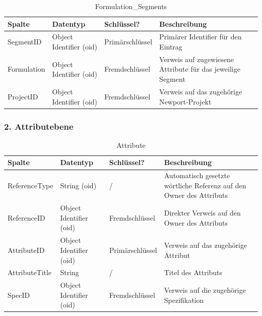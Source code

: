 \begin{table}[H]
    \centering
    \caption{Formulation\_Segments}
    \begin{tabularx}{\textwidth}{l l l X}
        \toprule
        \textbf{Spalte} & \textbf{Datentyp} & \textbf{Schlüssel?} & \textbf{Beschreibung} \\
        \midrule
        SegmentID & Object Identifier (oid) & Primärschlüssel & Primärer Identifier für den Eintrag\\
        Formulation & Object Identifier (oid) & Fremdschlüssel & Verweis auf zugewiesene Attribute für das jeweilige Segment\\
        ProjectID & Object Identifier (oid) & Fremdschlüssel & Verweis auf das zugehörige Newport-Projekt\\
        \bottomrule
    \end{tabularx}
    \label{tab:formulation_segments}
\end{table}
\subsubsection{2. Attributebene}
\begin{table}[H]
    \centering
    \caption{Attribute}
    \begin{tabularx}{\textwidth}{l l l X}
        \toprule
        \textbf{Spalte} & \textbf{Datentyp} & \textbf{Schlüssel?} & \textbf{Beschreibung} \\
        \midrule
        ReferenceType & String (oid) & / & Automatisch gesetzte wörtliche Referenz auf den Owner des Attributs\\
        ReferenceID & Object Identifier (oid) & Fremdschlüssel & Direkter Verweis auf den Owner des Attributs\\
        AttributeID & Object Identifier (oid) & Primärschlüssel & Verweis auf das zugehörige Attribut\\
        AttributeTitle & String & / & Titel des Attributs\\
        SpecID & Object Identifier (oid) & Fremdschlüssel & Verweis auf die zugehörige Spezifikation\\
        \bottomrule
    \end{tabularx}
    \label{tab:attribute}
\end{table}
